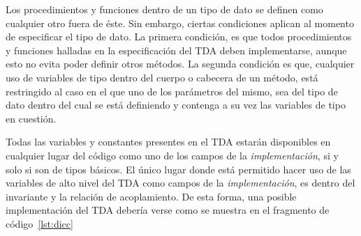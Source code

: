 Los procedimientos y funciones dentro de un tipo de dato se definen como
cualquier otro fuera de éste. Sin embargo, ciertas condiciones aplican al
momento de especificar el tipo de dato. La primera condición, es que todos
procedimientos y funciones halladas en la especificación del TDA deben
implementarse, aunque esto no evita poder definir otros métodos. La segunda
condición es que, cualquier uso de variables de tipo dentro del cuerpo o
cabecera de un método, está restringido al caso en el que uno de los
parámetros del mismo, sea del tipo de dato dentro del cual se está definiendo
y contenga a su vez las variables de tipo en cuestión.

Todas las variables y constantes presentes en el TDA estarán disponibles en
cualquier lugar del código como uno de los campos de la
\textit{implementación}, si y solo si son de tipos básicos. El único lugar 
donde está permitido hacer uso de las variables
de alto nivel del TDA como campos de la \textit{implementación}, es dentro del
invariante y la relación de acoplamiento. De esta forma, una posible
implementación del TDA  debería verse como se muestra
en el fragmento de código~\ref{lst:dicc}


